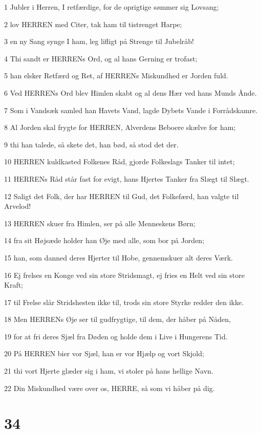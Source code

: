 \par 1 Jubler i Herren, I retfærdige, for de oprigtige sømmer sig Lovsang;
\par 2 lov HERREN med Citer, tak ham til tistrenget Harpe;
\par 3 en ny Sang synge I ham, leg lifligt på Strenge til Jubelråb!
\par 4 Thi sandt er HERRENs Ord, og al hans Gerning er trofast;
\par 5 han elsker Retfærd og Ret, af HERRENs Miskundhed er Jorden fuld.
\par 6 Ved HERRENs Ord blev Himlen skabt og al dens Hær ved hans Munds Ånde.
\par 7 Som i Vandsæk samled han Havets Vand, lagde Dybets Vande i Forrådskamre.
\par 8 Al Jorden skal frygte for HERREN, Alverdens Beboere skælve for ham;
\par 9 thi han talede, så skete det, han bød, så stod det der.
\par 10 HERREN kuldkasted Folkenes Råd, gjorde Folkeslags Tanker til intet;
\par 11 HERRENs Råd står fast for evigt, hans Hjertes Tanker fra Slægt til Slægt.
\par 12 Saligt det Folk, der har HERREN til Gud, det Folkefærd, han valgte til Arvelod!
\par 13 HERREN skuer fra Himlen, ser på alle Menneskens Børn;
\par 14 fra sit Højsæde holder han Øje med alle, som bor på Jorden;
\par 15 han, som danned deres Hjerter til Hobe, gennemskuer alt deres Værk.
\par 16 Ej frelses en Konge ved sin store Stridsmagt, ej fries en Helt ved sin store Kraft;
\par 17 til Frelse slår Stridshesten ikke til, trods sin store Styrke redder den ikke.
\par 18 Men HERRENs Øje ser til gudfrygtige, til dem, der håber på Nåden,
\par 19 for at fri deres Sjæl fra Døden og holde dem i Live i Hungerens Tid.
\par 20 På HERREN bier vor Sjæl, han er vor Hjælp og vort Skjold;
\par 21 thi vort Hjerte glæder sig i ham, vi stoler på hans hellige Navn.
\par 22 Din Miskundhed være over os, HERRE, så som vi håber på dig.

\chapter{34}

